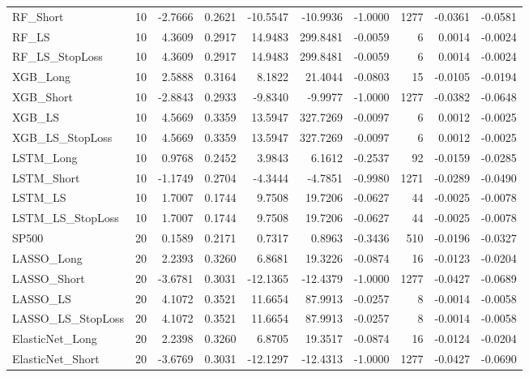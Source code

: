 \begin{tabular}{llrrrrrrrr}
\cline{1-10}
RF\_Short & 10 & -2.7666 & 0.2621 & -10.5547 & -10.9936 & -1.0000 & 1277 & -0.0361 & -0.0581 \\
\cline{1-10}
RF\_LS & 10 & 4.3609 & 0.2917 & 14.9483 & 299.8481 & -0.0059 & 6 & 0.0014 & -0.0024 \\
\cline{1-10}
RF\_LS\_StopLoss & 10 & 4.3609 & 0.2917 & 14.9483 & 299.8481 & -0.0059 & 6 & 0.0014 & -0.0024 \\
\cline{1-10}
XGB\_Long & 10 & 2.5888 & 0.3164 & 8.1822 & 21.4044 & -0.0803 & 15 & -0.0105 & -0.0194 \\
\cline{1-10}
XGB\_Short & 10 & -2.8843 & 0.2933 & -9.8340 & -9.9977 & -1.0000 & 1277 & -0.0382 & -0.0648 \\
\cline{1-10}
XGB\_LS & 10 & 4.5669 & 0.3359 & 13.5947 & 327.7269 & -0.0097 & 6 & 0.0012 & -0.0025 \\
\cline{1-10}
XGB\_LS\_StopLoss & 10 & 4.5669 & 0.3359 & 13.5947 & 327.7269 & -0.0097 & 6 & 0.0012 & -0.0025 \\
\cline{1-10}
LSTM\_Long & 10 & 0.9768 & 0.2452 & 3.9843 & 6.1612 & -0.2537 & 92 & -0.0159 & -0.0285 \\
\cline{1-10}
LSTM\_Short & 10 & -1.1749 & 0.2704 & -4.3444 & -4.7851 & -0.9980 & 1271 & -0.0289 & -0.0490 \\
\cline{1-10}
LSTM\_LS & 10 & 1.7007 & 0.1744 & 9.7508 & 19.7206 & -0.0627 & 44 & -0.0025 & -0.0078 \\
\cline{1-10}
LSTM\_LS\_StopLoss & 10 & 1.7007 & 0.1744 & 9.7508 & 19.7206 & -0.0627 & 44 & -0.0025 & -0.0078 \\
\cline{1-10}
SP500 & 20 & 0.1589 & 0.2171 & 0.7317 & 0.8963 & -0.3436 & 510 & -0.0196 & -0.0327 \\
\cline{1-10}
LASSO\_Long & 20 & 2.2393 & 0.3260 & 6.8681 & 19.3226 & -0.0874 & 16 & -0.0123 & -0.0204 \\
\cline{1-10}
LASSO\_Short & 20 & -3.6781 & 0.3031 & -12.1365 & -12.4379 & -1.0000 & 1277 & -0.0427 & -0.0689 \\
\cline{1-10}
LASSO\_LS & 20 & 4.1072 & 0.3521 & 11.6654 & 87.9913 & -0.0257 & 8 & -0.0014 & -0.0058 \\
\cline{1-10}
LASSO\_LS\_StopLoss & 20 & 4.1072 & 0.3521 & 11.6654 & 87.9913 & -0.0257 & 8 & -0.0014 & -0.0058 \\
\cline{1-10}
ElasticNet\_Long & 20 & 2.2398 & 0.3260 & 6.8705 & 19.3517 & -0.0874 & 16 & -0.0124 & -0.0204 \\
\cline{1-10}
ElasticNet\_Short & 20 & -3.6769 & 0.3031 & -12.1297 & -12.4313 & -1.0000 & 1277 & -0.0427 & -0.0690 \\

\end{tabular}
